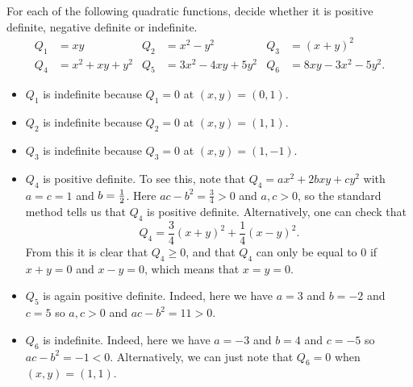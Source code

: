 \documentclass[a4paper]{amsart}
\begin{document}
\begin{exercise}\label{ex-quad-definite}
 For each of the following quadratic functions, decide whether it is
 positive definite, negative definite or indefinite.
 \begin{align*}
  Q_1 &= xy & Q_2 &= x^2-y^2 & Q_3 &= (x+y)^2 \\
  Q_4 &= x^2+xy+y^2 & Q_5 &= 3x^2-4xy+5y^2 & Q_6 &=8xy-3x^2-5y^2.
 \end{align*}
\end{exercise}
\begin{solution}\leavevmode
 \begin{itemize}
  \item $Q_1$ is indefinite because $Q_1=0$ at $(x,y)=(0,1)$.
  \item $Q_2$ is indefinite because $Q_2=0$ at $(x,y)=(1,1)$.
  \item $Q_3$ is indefinite because $Q_3=0$ at $(x,y)=(1,-1)$.
  \item $Q_4$ is positive definite.  To see this, note that
   $Q_4=ax^2+2bxy+cy^2$ with $a=c=1$ and $b=\tfrac{1}{2}$.  Here
   $ac-b^2=\frac{3}{4}>0$ and $a,c>0$, so the standard method tells us
   that $Q_4$ is positive definite.  Alternatively, one can check that 
   \[ Q_4 = \frac{3}{4}(x+y)^2 + \frac{1}{4}(x-y)^2. \]
   From this it is clear that $Q_4\geq 0$, and that $Q_4$ can only be
   equal to $0$ if $x+y=0$ and $x-y=0$, which means that $x=y=0$.
  \item $Q_5$ is again positive definite.  Indeed, here we have $a=3$
   and $b=-2$ and $c=5$ so $a,c>0$ and $ac-b^2=11>0$.
  \item $Q_6$ is indefinite.  Indeed, here we have $a=-3$ and $b=4$
   and $c=-5$ so $ac-b^2=-1<0$.  Alternatively, we can just note that
   $Q_6=0$ when $(x,y)=(1,1)$.
 \end{itemize}
\end{solution}
\end{document}
